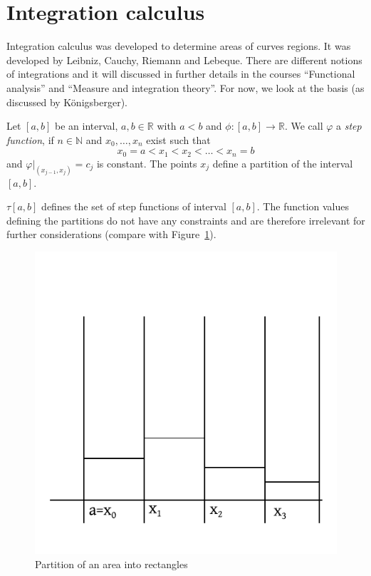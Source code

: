 \documentclass[a4paper,landscape,twocolumn]{article}
\theoremstyle{definition}
\begin{document}
\section{Integration calculus}
%
Integration calculus was developed to determine areas of curves regions.
It was developed by Leibniz, Cauchy, Riemann and Lebeque. There are different
notions of integrations and it will discussed in further details in the courses
\enquote{Functional analysis} and \enquote{Measure and integration theory}.
For now, we look at the basis (as discussed by \foreignlanguage{ngerman}{Königsberger}).

Let $[a,b]$ be an interval, $a,b \in \mathbb R$ with $a<b$ and $\phi: [a,b] \to \mathbb R$.
We call $\varphi$ a \emph{step function}, if $n \in \mathbb N$ and $x_0, \ldots, x_n$
exist such that
\[ x_0 = a < x_1 < x_2 < \ldots < x_n = b \]
and $\varphi|_{(x_{j-1}, x_j)} = c_j$ is constant.
The points $x_j$ define a partition of the interval $[a,b]$.

$\tau[a,b]$ defines the set of step functions of interval $[a,b]$.
The function values defining the partitions do not have any constraints and
are therefore irrelevant for further considerations (compare with Figure~\ref{img:partition-int}).

\begin{figure}[!h]
  \begin{center}
    \includegraphics{img/partition-of-integral.pdf}
    \caption{Partition of an area into rectangles}
    \label{img:partition-int}
  \end{center}
\end{figure}
\end{document}
